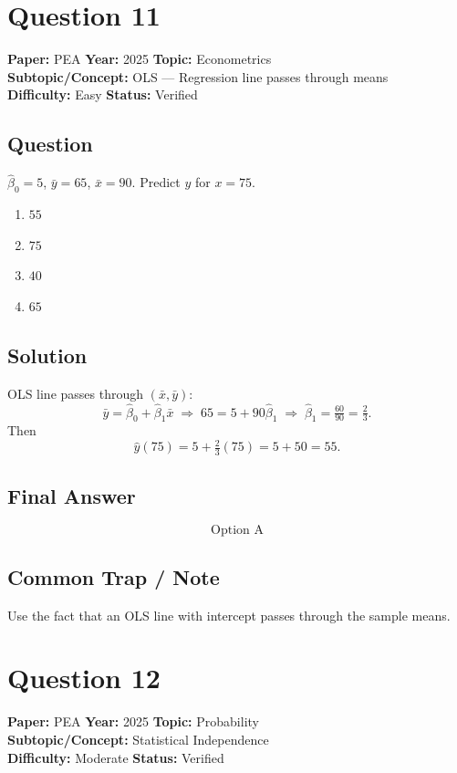 \documentclass[11pt]{article}
\begin{document}
\section*{Question 11}
\textbf{Paper:} PEA \quad \textbf{Year:} 2025 \quad \textbf{Topic:} Econometrics \\
\textbf{Subtopic/Concept:} OLS --- Regression line passes through means \\
\textbf{Difficulty:} Easy \quad \textbf{Status:} Verified

\subsection*{Question}
$\hat\beta_0 = 5$, $\bar y = 65$, $\bar x = 90$. Predict $y$ for $x = 75$.
\begin{enumerate}[label=(\Alph*)]
\item $55$ \item $75$ \item $40$ \item $65$
\end{enumerate}

\subsection*{Solution}
OLS line passes through $(\bar x, \bar y)$:
\[
\bar y = \hat\beta_0 + \hat\beta_1 \bar x \;\Longrightarrow\; 65 = 5 + 90\hat\beta_1 \;\Longrightarrow\; \hat\beta_1 = \tfrac{60}{90} = \tfrac{2}{3}.
\]
Then
\[
\hat y(75) = 5 + \tfrac{2}{3}(75) = 5 + 50 = 55.
\]

\subsection*{Final Answer}
\[
\boxed{\text{Option A}}
\]

\subsection*{Common Trap / Note}
Use the fact that an OLS line with intercept passes through the sample means.

\section*{Question 12}
\textbf{Paper:} PEA \quad \textbf{Year:} 2025 \quad \textbf{Topic:} Probability \\
\textbf{Subtopic/Concept:} Statistical Independence \\
\textbf{Difficulty:} Moderate \quad \textbf{Status:} Verified
\end{document}
